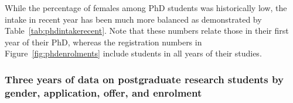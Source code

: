 % 
% 
% 

While the percentage of females among PhD students was historically 
low,  the intake in recent year has been much more balanced as 
demonstrated by Table~\ref{tab:phdintakerecent}. Note that these
numbers relate those in their first year of their PhD, whereas the 
registration numbers in Figure~\ref{fig:phdenrolments} include students  in all years of their studies.








\subsubsection{Three years of data on postgraduate research students by gender, 
application, offer, and enrolment}
\label{sec:phdnumbers}



